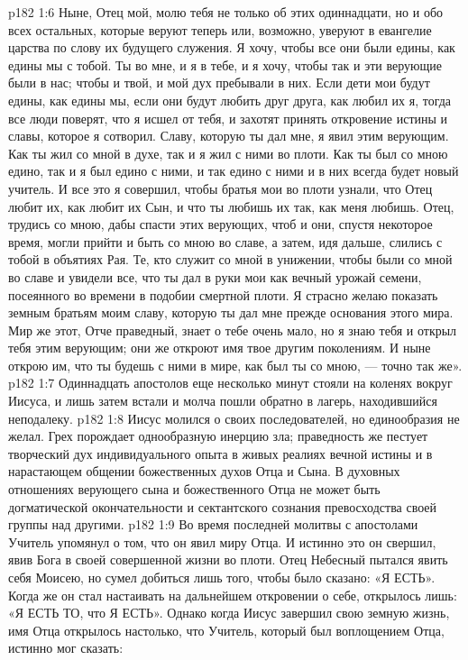 \vs p182 1:6 Ныне, Отец мой, молю тебя не только об этих одиннадцати, но и обо всех остальных, которые веруют теперь или, возможно, уверуют в евангелие царства по слову их будущего служения. Я хочу, чтобы все они были едины, как едины мы с тобой. Ты во мне, и я в тебе, и я хочу, чтобы так и эти верующие были в нас; чтобы и твой, и мой дух пребывали в них. Если дети мои будут едины, как едины мы, если они будут любить друг друга, как любил их я, тогда все люди поверят, что я исшел от тебя, и захотят принять откровение истины и славы, которое я сотворил. Славу, которую ты дал мне, я явил этим верующим. Как ты жил со мной в духе, так и я жил с ними во плоти. Как ты был со мною едино, так и я был едино с ними, и так едино с ними и в них всегда будет новый учитель. И все это я совершил, чтобы братья мои во плоти узнали, что Отец любит их, как любит их Сын, и что ты любишь их так, как меня любишь. Отец, трудись со мною, дабы спасти этих верующих, чтоб и они, спустя некоторое время, могли прийти и быть со мною во славе, а затем, идя дальше, слились с тобой в объятиях Рая. Те, кто служит со мной в унижении, чтобы были со мной во славе и увидели все, что ты дал в руки мои как вечный урожай семени, посеянного во времени в подобии смертной плоти. Я страсно желаю показать земным братьям моим славу, которую ты дал мне прежде основания этого мира. Мир же этот, Отче праведный, знает о тебе очень мало, но я знаю тебя и открыл тебя этим верующим; они же откроют имя твое другим поколениям. И ныне открою им, что ты будешь с ними в мире, как был ты со мною, --- точно так же».
\vs p182 1:7 Одиннадцать апостолов еще несколько минут стояли на коленях вокруг Иисуса, и лишь затем встали и молча пошли обратно в лагерь, находившийся неподалеку.
\vs p182 1:8 \pc Иисус молился о  своих последователей, но единообразия не желал. Грех порождает однообразную инерцию зла; праведность же пестует творческий дух индивидуального опыта в живых реалиях вечной истины и в нарастающем общении божественных духов Отца и Сына. В духовных отношениях верующего сына и божественного Отца не может быть догматической окончательности и сектантского сознания превосходства своей группы над другими.
\vs p182 1:9 Во время последней молитвы с апостолами Учитель упомянул о том, что он явил миру  Отца. И истинно это он свершил, явив Бога в своей совершенной жизни во плоти. Отец Небесный пытался явить себя Моисею, но сумел добиться лишь того, чтобы было сказано: «Я ЕСТЬ». Когда же он стал настаивать на дальнейшем откровении о себе, открылось лишь: «Я ЕСТЬ ТО, что Я ЕСТЬ». Однако когда Иисус завершил свою земную жизнь, имя Отца открылось настолько, что Учитель, который был воплощением Отца, истинно мог сказать:
